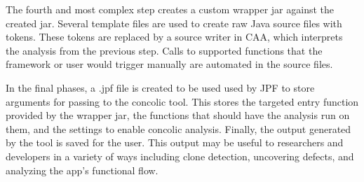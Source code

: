 \documentclass{sig-alternate}
\newcommand{\todo}[1]{\textcolor{cyan}{\textbf{[#1]}}}
\begin{document}
The fourth and most complex step creates a custom wrapper jar against the created jar. Several template files are used to create raw Java source files with tokens. These tokens are replaced by a source writer in CAA, which interprets the analysis from the previous step. Calls to supported functions that the framework or user would trigger manually are automated in the source files.


In the final phases, a .jpf file is created to be used used by JPF to store arguments for passing to the concolic tool. This stores the targeted entry function provided by the wrapper jar, the functions that should have the analysis run on them, and the settings to enable concolic analysis. Finally, the output generated by the tool is saved for the user. This output may be useful to researchers and developers in a variety of ways including clone detection, uncovering defects, and analyzing the app's functional flow.



\end{document}
